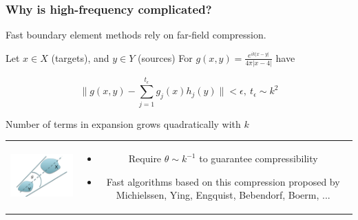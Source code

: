 \documentclass[dvipsnames,10pt]{beamer}
\begin{document}
\begin{frame}
	\frametitle{Why is high-frequency complicated?}
	
	\vspace{.5cm}
	
	Fast boundary element methods rely on far-field compression.
	
	Let $x\in X$ (targets), and $y\in Y$ (sources) For $g(x, y) = \frac{e^{ik|x-y|}}{4\pi|x-4|}$ have
	
	$$
	\|g(x, y) - \sum_{j=1}^{t_{\epsilon}}g_j(x)h_j(y)\|<\epsilon,~t_{\epsilon}\sim k^2
	$$
	
	\begin{tcolorbox}
		Number of terms in expansion grows quadratically with $k$
	\end{tcolorbox}
	
	\begin{center}
		\begin{tabular}{cc}
			
			\includegraphics[width=5cm]{../figs/high_freq_admissibility} &
			
			\begin{minipage}{5cm}
				\vspace{-2cm}
				\begin{itemize}
					\item Require $\theta\sim k^{-1}$ to guarantee compressibility
					\item Fast algorithms based on this compression proposed by Michielssen, Ying, Engquist, Bebendorf, Boerm, ...
				\end{itemize}
				\end{minipage}
			
		\end{tabular}
	\end{center}
	
	
\end{frame}
\end{document}
